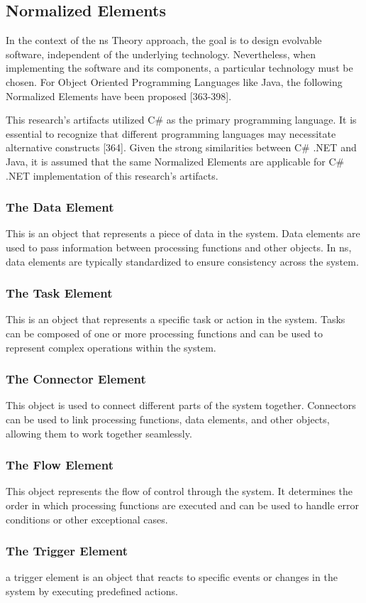 \subsection{Normalized Elements} \label{subsec_ns_elements} 

In the context of the \gls{ns} Theory approach, the goal is to design evolvable software,
independent of the underlying technology. Nevertheless, when implementing the software and
its components, a particular technology must be chosen. For Object Oriented Programming
Languages like Java, the following Normalized Elements have been proposed
\parencite{mannaert_normalized_2016}[363-398].

This research's artifacts utilized C\# as the primary programming language. It is essential
to recognize that different programming languages may necessitate alternative constructs
\parencite{mannaert_normalized_2016}[364]. Given the strong similarities between C\# .NET
and Java, it is assumed that the same Normalized Elements are applicable for C\# .NET
implementation of this research's artifacts.

\subsubsection{The Data Element}
This is an object that represents a piece of data in the system. Data elements are used to
pass information between processing functions and other objects. In \gls{ns},
data elements are typically standardized to ensure consistency across the system.

\subsubsection{The Task Element}
This is an object that represents a specific task or action in the system. Tasks can be
composed of one or more processing functions and can be used to represent complex
operations within the system.

\subsubsection{The Connector Element}
This object is used to connect different parts of the system together. Connectors can be
used to link processing functions, data elements, and other objects, allowing them to work
together seamlessly.

\subsubsection{The Flow Element}
This object represents the flow of control through the system. It determines the order in
which processing functions are executed and can be used to handle error conditions or
other exceptional cases.

\subsubsection{The Trigger Element}
a trigger element is an object that reacts to specific events or changes in the system
by executing predefined actions.